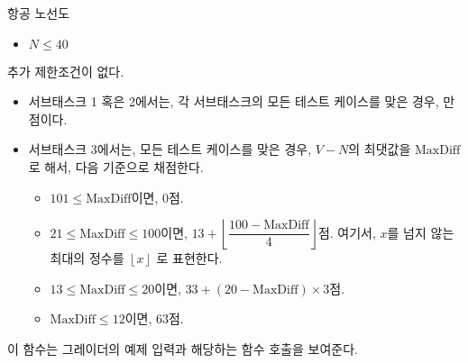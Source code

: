 \begin{problem}{항공 노선도}
\begin{itemize}
	\item $N \le 40$
\end{itemize}


추가 제한조건이 없다.


\Scoring

\begin{itemize}
	\item 서브태스크 1 혹은 2에서는, 각 서브태스크의 모든 테스트 케이스를 맞은 경우, 만점이다.
	\item 서브태스크 3에서는, 모든 테스트 케이스를 맞은 경우, $V-N$의 최댓값을 $\textrm{MaxDiff}$로 해서, 다음 기준으로 채점한다.
	\begin{itemize}
		\item $101 \le \textrm{MaxDiff}$이면, 0점.
		\item $21 \le \textrm{MaxDiff} \le 100$이면, $13+\left\lfloor\dfrac{100-\textrm{MaxDiff}}{4}\right\rfloor$점. 여기서, $x$를 넘지 않는 최대의 정수를 $\left\lfloor x \right\rfloor$ 로 표현한다.
		\item $13 \le \textrm{MaxDiff} \le 20$이면, $33+(20-\textrm{MaxDiff}) \times 3$점.
		\item $\textrm{MaxDiff} \le 12$이면, 63점.
	\end{itemize}
\end{itemize}

\Examples

이 함수는 그레이더의 예제 입력과 해당하는 함수 호출을 보여준다.


\end{problem}
